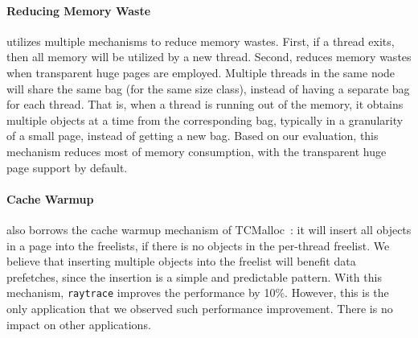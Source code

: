 \paragraph{Reducing Memory Waste} \NM{} utilizes multiple mechanisms to reduce memory wastes. First, if a thread exits, then all memory will be utilized by a new thread. Second, \NM{} reduces memory wastes when transparent huge pages are employed.  Multiple threads in the same node will share the same bag (for the same size class), instead of having a separate bag for each thread.  That is, when  a thread is running out of the memory, it obtains multiple objects at a time from the corresponding bag, typically in a granularity of a small page, instead of getting a new bag. Based on our evaluation, this mechanism reduces most of memory consumption, with the transparent huge page support by default.  




\paragraph{Cache Warmup} \NM{} also borrows the cache warmup mechanism of TCMalloc~\cite{tcmalloc}: it will insert all objects in a page into the freelists, if there is no objects in the per-thread freelist. We believe that inserting multiple objects into the freelist will benefit data prefetches, since the insertion is a simple and predictable pattern. With this mechanism, \texttt{raytrace} improves the performance by 10\%. However, this is the only application that we observed such performance improvement. There is no impact on other applications. 

